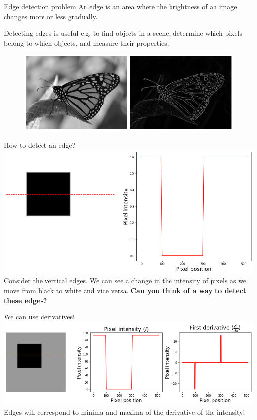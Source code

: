 \documentclass[9pt, aspectratio=169]{beamer}
\begin{document}
\begin{frame}
    {Edge detection problem}
    An edge is an area where the brightness of an image changes more or less gradually.

    Detecting edges is useful e.g. to find objects in a scene, determine which pixels belong to which objects, and measure their properties.
    \begin{figure}
        \includegraphics[width=\textwidth]{monarch_sobel.png}
        \caption{\footnotesize{\color{gray}{Monarch butterfly - CC-BY-SA 2.0 Ted @ Flickr}\color{black}}}
    \end{figure}
\end{frame}

\begin{frame}
    {How to detect an edge?}
    \includegraphics[width=\textwidth]{line_intensity.png}
    Consider the vertical edges. We can see a change in the intensity of pixels as we move from black to white and vice versa. \textbf{Can you think of a way to detect these edges?}
\end{frame}

\begin{frame}
    {We can use derivatives!}
    \includegraphics[width=\textwidth]{intensity_derivative.png}
    Edges will correspond to minima and maxima of the derivative of the intensity!
\end{frame}
\end{document}
